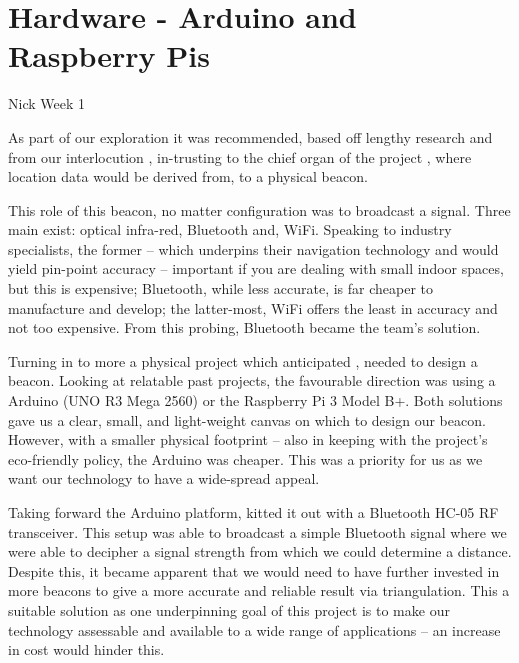 \section{Hardware - Arduino and Raspberry Pis}
Nick Week 1

As part of our exploration it was recommended, based off lengthy research and from our interlocution  , in-trusting to the chief organ of the project , where location data would be derived from, to a physical beacon. 

This role of this beacon, no matter  configuration was to broadcast a signal.  Three main  exist: optical infra-red, Bluetooth and,  WiFi. Speaking to industry specialists, the former – which underpins their navigation technology and would yield pin-point accuracy – important if you are dealing with small indoor spaces, but this is expensive; Bluetooth, while less accurate,  is far cheaper to manufacture and develop; the latter-most, WiFi offers the least in accuracy and not too expensive. From this probing, Bluetooth became the team’s  solution.

Turning in to more a physical project which  anticipated ,  needed to design a beacon. Looking at relatable past projects, the favourable direction was using a Arduino (UNO R3 Mega 2560) or the Raspberry Pi 3 Model B+. Both solutions gave us a clear, small, and light-weight canvas on which to design our beacon. However, with a smaller physical footprint – also in keeping with the project’s eco-friendly policy, the Arduino was cheaper. This was a priority for us as we want our technology to have a wide-spread appeal. 

Taking forward the Arduino platform,  kitted it out with a Bluetooth HC-05 RF transceiver. This setup was able to broadcast a simple Bluetooth signal where we were able to decipher a signal strength from which we could determine a distance. Despite this, it became apparent that we would need to have further invested in more beacons to give a more accurate and reliable result via triangulation. This  a suitable solution as one underpinning goal of this project is to make our technology assessable and available to a wide range of applications – an increase in cost would hinder this.

